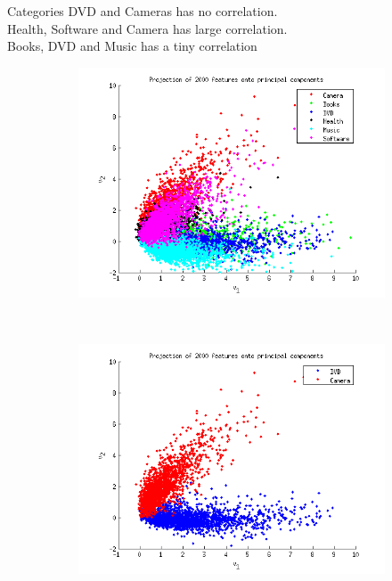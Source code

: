 Categories DVD and Cameras has no correlation.\\
Health, Software and Camera has large correlation.\\
Books, DVD and Music has a tiny correlation
\begin{figure}[h!btcp]
        \centering
       \begin{subfigure}[b]{0.5\linewidth}
                \centering
                \includegraphics[width=\textwidth]{../Plottar/pca_all.png}
               \caption{}
        \end{subfigure}%
        ~ %
        \begin{subfigure}[b]{0.5\linewidth}
                \centering
                \includegraphics[width=\linewidth]{../Plottar/pca_nocorr.png} 

\end{subfigure}
\end{figure}
